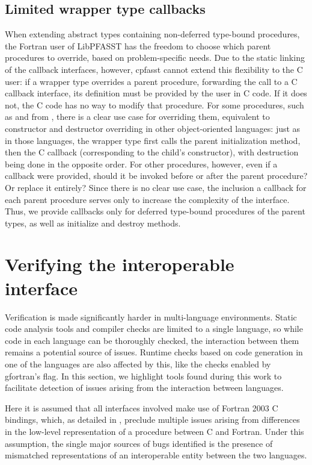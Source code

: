 \subsection*{Limited wrapper type callbacks}

When extending abstract types containing non-deferred type-bound procedures, the Fortran user of LibPFASST has the freedom to choose which parent procedures to override, based on problem-specific needs. Due to the static linking of the callback interfaces, however, cpfasst cannot extend this flexibility to the C user: if a wrapper type overrides a parent procedure, forwarding the call to a C callback interface, its definition must be provided by the user in C code. If it does not, the C code has no way to modify that procedure. For some procedures, such as  and  from , there is a clear use case for overriding them, equivalent to constructor and destructor overriding in other object-oriented languages: just as in those languages, the wrapper type first calls the parent initialization method, then the C callback (corresponding to the child's constructor), with destruction being done in the opposite order. For other procedures, however, even if a callback were provided, should it be invoked before or after the parent procedure? Or replace it entirely? Since there is no clear use case, the inclusion a callback for each parent procedure serves only to increase the complexity of the interface. Thus, we provide callbacks only for deferred type-bound procedures of the parent types, as well as initialize and destroy methods.

\section{Verifying the interoperable interface} \label{sec:impl_verification}

Verification is made significantly harder in multi-language environments. Static code analysis tools and compiler checks are limited to a single language, so while code in each language can be thoroughly checked, the interaction between them remains a potential source of issues. Runtime checks based on code generation in one of the languages are also affected by this, like the checks enabled by gfortran's  flag. In this section, we highlight tools found during this work to facilitate detection of issues arising from the interaction between languages.

Here it is assumed that all interfaces involved make use of Fortran 2003 C bindings, which, as detailed in , preclude multiple issues arising from differences in the low-level representation of a procedure between C and Fortran. Under this assumption, the single major sources of bugs identified is the presence of mismatched representations of an interoperable entity between the two languages.

